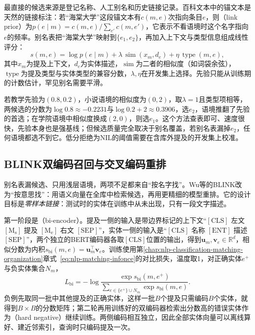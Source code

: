 最直接的候选来源是登记名称、人工别名和历史链接记录。百科文本中的锚文本是天然的链接标注：若“海棠大学”这段锚文本有$c(m,e)$次指向条目$e$，则（link prior）为$p(e\mid m)=c(m,e)/\sum_{e'}c(m,e')$，它表示不看语境时这个名字指向$e$的频率。别名表把“海棠大学”映射到$\{e_1,e_2\}$，再加入上下文与类型信息组成线性评分：
\begin{equation}
  s(m,e)=\log p(e\mid m)+
  \lambda\,\operatorname{sim}(x_m,d_e)+
  \eta\,\operatorname{type}(m,e),
  \label{eq:nlp-extraction-alias}
\end{equation}
其中$x_m$为提及上下文，$d_e$为实体描述，$\operatorname{sim}$为二者的相似度（如词袋余弦），$\operatorname{type}$为提及类型与实体类型的兼容分数，$\lambda,\eta$在开发集上选择。先验只能从训练期的计数估计，罕见别名需要平滑。

若教学先验为$(0.8,0.2)$，小说语境的相似度为$(0,2)$，取$\lambda=1$且类型项相等，两候选的分数为$\log0.8\approx-0.2231$与$\log0.2+2\approx0.3906$，选$e_2$，语境推翻了先验的首选；在学院语境中相似度换成$(2,0)$，则选$e_1$。这个方法查表即可、速度很快，先验本身也是强基线；但候选质量完全取决于别名覆盖，若别名表漏掉$e_2$，任何语境都选不到它。低分拒绝为NIL的阈值需要在含库外提及的开发集上校准。

\subsection{BLINK双编码召回与交叉编码重排}
\label{sec:nlp-extraction-blink}

别名表漏候选、只用浅层语境，两项不足都来自“按名字找”。Wu等的BLINK改为“按意思找”：用语义向量在全库中检索候选，再用更精细的模型重排。它的设计目标是\emph{零样本链接}：测试时的实体在训练中从未出现，只有一段文字描述。

第一阶段是（bi-encoder）。提及一侧的输入是带边界标记的上下文“$[\mathrm{CLS}]$ 左文 $[\mathrm{M_s}]$ 提及 $[\mathrm{M_e}]$ 右文 $[\mathrm{SEP}]$”，实体一侧的输入是“$[\mathrm{CLS}]$ 名称 $[\mathrm{ENT}]$ 描述 $[\mathrm{SEP}]$”，两个独立的BERT编码器各取$[\mathrm{CLS}]$位置的输出，得到$\bm u_m,\bm v_e\in\mathbb R^{d}$，相似分数为内积$s_{\mathrm{bi}}(m,e)=\bm u_m^\top\bm v_e$。训练使用第\ref{chap:nlp-classification-matching-organization}章式~\eqref{eq:nlp-matching-infonce}的对比损失，温度取1，对正确实体$e^+$与负实体集合$N_m$，
\begin{equation}
  L_{\mathrm{bi}}=
  -\log\frac{\exp s_{\mathrm{bi}}(m,e^+)}
  {\sum_{e\in\{e^+\}\cup N_m}\exp s_{\mathrm{bi}}(m,e)}.
  \label{eq:nlp-extraction-blink}
\end{equation}
负例先取同一批中其他提及的正确实体，这样一批$B$个提及只需编码$B$个实体，就得到$B\times B$的分数矩阵；第二轮再用训练好的双编码器检索出分数高的错误实体作为（hard negative）继续训练。两侧编码相互独立，因此全部实体向量可以离线算好、建近邻索引，查询时只编码提及一次。

